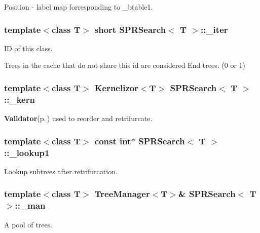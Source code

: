 Position - label map forresponding to \_\-btable1. 

\subsubsection{\setlength{\rightskip}{0pt plus 5cm}template$<$class T$>$ short {\bf SPRSearch}$<$ T $>$::{\bf \_\-iter}\hspace{0.3cm}{\tt  [protected]}}\label{classSPRSearch_p20}


ID of this class. 

Trees in the cache that do not share this id are considered End trees. (0 or 1) 
\subsubsection{\setlength{\rightskip}{0pt plus 5cm}template$<$class T$>$ {\bf Kernelizor}$<$T$>$ {\bf SPRSearch}$<$ T $>$::{\bf \_\-kern}\hspace{0.3cm}{\tt  [protected]}}\label{classSPRSearch_p6}


{\bf Validator}{\rm (p.\,\pageref{classValidator})} used to reorder and retrifurcate. 

\subsubsection{\setlength{\rightskip}{0pt plus 5cm}template$<$class T$>$ const int$\ast$ {\bf SPRSearch}$<$ T $>$::{\bf \_\-lookup1}\hspace{0.3cm}{\tt  [protected]}}\label{classSPRSearch_p18}


Lookup subtrees after retrifurcation. 

\subsubsection{\setlength{\rightskip}{0pt plus 5cm}template$<$class T$>$ {\bf Tree\-Manager}$<$T$>$\& {\bf SPRSearch}$<$ T $>$::{\bf \_\-man}\hspace{0.3cm}{\tt  [protected]}}\label{classSPRSearch_p4}


A pool of trees. 

